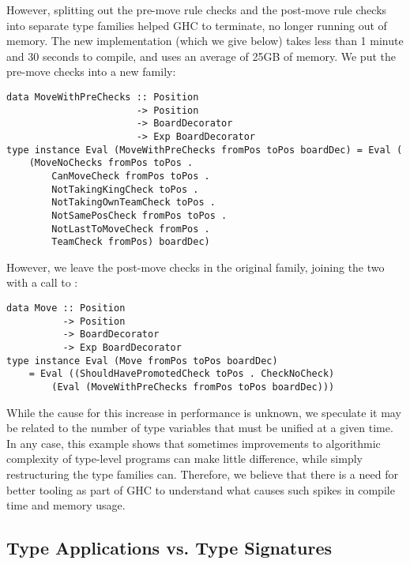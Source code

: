 However, splitting out the pre-move rule checks and the post-move rule checks into separate type families helped GHC to terminate, no longer running out of memory. The new implementation (which we give below) takes less than 1 minute and 30 seconds to compile, and uses an average of 25GB of memory. We put the pre-move checks into a new  family:

\begin{lstlisting}
data MoveWithPreChecks :: Position
                       -> Position
                       -> BoardDecorator
                       -> Exp BoardDecorator
type instance Eval (MoveWithPreChecks fromPos toPos boardDec) = Eval (
    (MoveNoChecks fromPos toPos .
        CanMoveCheck fromPos toPos .
        NotTakingKingCheck toPos .
        NotTakingOwnTeamCheck toPos .
        NotSamePosCheck fromPos toPos .
        NotLastToMoveCheck fromPos .
        TeamCheck fromPos) boardDec)
\end{lstlisting}

However, we leave the post-move checks in the original  family, joining the two with a call to :

\begin{lstlisting}
data Move :: Position
          -> Position
          -> BoardDecorator
          -> Exp BoardDecorator
type instance Eval (Move fromPos toPos boardDec)
    = Eval ((ShouldHavePromotedCheck toPos . CheckNoCheck)
        (Eval (MoveWithPreChecks fromPos toPos boardDec)))
\end{lstlisting}

While the cause for this increase in performance is unknown, we speculate it may be related to the number of type variables that must be unified at a given time. In any case, this example shows that sometimes improvements to algorithmic complexity of type-level programs can make little difference, while simply restructuring the type families can. Therefore, we believe that there is a need for better tooling as part of GHC to understand what causes such spikes in compile time and memory usage.

\subsection{Type Applications vs. Type Signatures}

